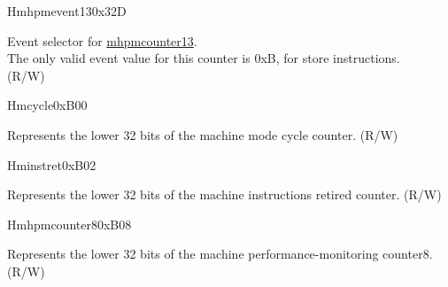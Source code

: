 \begin{register}{H}{mhpmevent13}{0x32D}\label{regdesc:MHPMEVENT13}
%
%
\regnewline%
\begin{regdesc}\begin{reglist}
\label{fielddesc:MHPMEVENT13_EVENT}\item [{EVENT[4:0]}] Event selector for \hyperref[regdesc:MHPMCOUNTER13]{mhpmcounter13}.\\
The only valid event value for this counter is 0xB, for store instructions.\\
(R/W)
\end{reglist}\end{regdesc}
\end{register}


\begin{register}{H}{mcycle}{0xB00}\label{regdesc:MCYCLE}
%
\regnewline%
\begin{regdesc}\begin{reglist}
\label{fielddesc:MCYCLE}\item [MCYCLE] Represents the lower 32 bits of the machine mode cycle counter. (R/W)
\end{reglist}\end{regdesc}
\end{register}

\begin{register}{H}{minstret}{0xB02}\label{regdesc:MINSTRET}
%
\regnewline%
\begin{regdesc}\begin{reglist}
\label{fielddesc:MINSTRET}\item [MINSTRET] Represents the lower 32 bits of the machine instructions retired counter. (R/W)
\end{reglist}\end{regdesc}
\end{register}

\begin{register}{H}{mhpmcounter8}{0xB08}\label{regdesc:MHPMCOUNTER8}
%
\regnewline%
\begin{regdesc}\begin{reglist}
\label{fielddesc:MHPMCOUNTER8}\item [MHPMCOUNTER8] Represents the lower 32 bits of the machine performance-monitoring counter8. (R/W)
\end{reglist}\end{regdesc}
\end{register}

